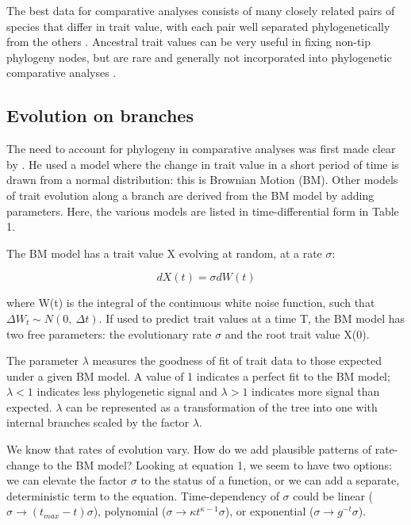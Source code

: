 \documentclass[12pt]{article}
\begin{document}
The best data for comparative analyses consists of many closely related pairs of species that differ in trait value, with each pair well separated phylogenetically from the others \citep{garland_phylogenetic_2005}. 
Ancestral trait values can be very useful in fixing non-tip phylogeny nodes, but are rare and generally not incorporated into phylogenetic comparative analyses \citep{harmon_early_2010}. 

\subsection{Evolution on branches}

The need to account for phylogeny in comparative analyses was first made clear by \citet{felsenstein_phylogenies_1985}. 
He used a model where the change in trait value in a short period of time is drawn from a normal distribution: this is Brownian Motion (BM). 
Other models of trait evolution along a branch are derived from the BM model by adding parameters. 
Here, the various models are listed in time-differential form in Table 1. 

The BM model has a trait value X evolving at random, at a rate $\sigma$:

\begin{equation}
	dX(t) = \sigma dW(t)
\end{equation}

where W(t) is the integral of the continuous white noise function, such that $ \Delta W_t \sim N(0, ~\Delta t)$. 
If used to predict trait values at a time T, the BM model has two free parameters: the evolutionary rate $\sigma$ and the root trait value X(0).

The parameter $\lambda$ \citep{pagel_inferring_1997,pagel_inferring_1999} measures the goodness of fit of trait data to those expected under a given BM model.  
A value of 1 indicates a perfect fit to the BM model; $\lambda<1$ indicates less phylogenetic signal and $\lambda>1$ indicates more signal than expected. 
$\lambda$ can be represented as a transformation of the tree into one with internal branches scaled by the factor $\lambda$.

We know that rates of evolution vary. How do we add plausible patterns of rate-change to the BM model? 
Looking at equation 1, we seem to have two options: we can elevate the factor $\sigma$ to the status of a function, or we can add a separate, deterministic term to the equation. 
Time-dependency of $\sigma$ could be linear ($ \sigma \rightarrow (t_{max}-t)\sigma$), polynomial ($ \sigma \rightarrow  \kappa t^{\kappa - 1} \sigma $), or exponential ($ \sigma  \rightarrow g^{-t} \sigma $). 
\end{document}
